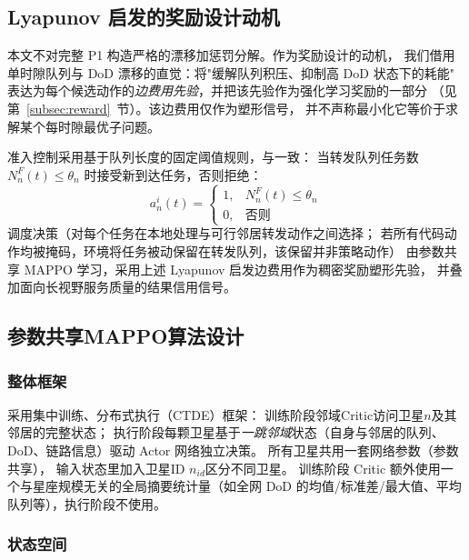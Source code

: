 \documentclass[a4paper,11pt]{article}
\begin{document}
\subsection{Lyapunov 启发的奖励设计动机}

本文不对完整 P1 构造严格的漂移加惩罚分解。作为奖励设计的动机，
我们借用单时隙队列与 DoD 漂移的直觉：将"缓解队列积压、抑制高 DoD 状态下的耗能"
表达为每个候选动作的\emph{边费用先验}，并把该先验作为强化学习奖励的一部分
（见第~\ref{subsec:reward}~节）。该边费用仅作为塑形信号，
并不声称最小化它等价于求解某个每时隙最优子问题。

准入控制采用基于队列长度的固定阈值规则，与\cite{zhang2024mhspo}一致：
当转发队列任务数 $N^F_n(t) \le \theta_n$ 时接受新到达任务，否则拒绝：
\begin{equation}
a^i_n(t) = \begin{cases} 1, & N^F_n(t) \leq \theta_n \\ 0, & \text{否则} \end{cases}
\label{eq:admission}
\end{equation}
调度决策（对每个任务在本地处理与可行邻居转发动作之间选择；
若所有代码动作均被掩码，环境将任务被动保留在转发队列，该保留并非策略动作）
由参数共享 MAPPO 学习，采用上述 Lyapunov 启发边费用作为稠密奖励塑形先验，
并叠加面向长视野服务质量的结果信用信号。

\subsection{参数共享MAPPO算法设计}

\subsubsection{整体框架}

采用集中训练、分布式执行（CTDE）框架：
训练阶段邻域Critic访问卫星$n$及其邻居的完整状态；
执行阶段每颗卫星基于\emph{一跳邻域}状态（自身与邻居的队列、DoD、链路信息）驱动 Actor 网络独立决策。
所有卫星共用一套网络参数（参数共享），
输入状态里加入卫星ID $n_{id}$区分不同卫星。
训练阶段 Critic 额外使用一个与星座规模无关的全局摘要统计量（如全网 DoD 的均值/标准差/最大值、平均队列等），执行阶段不使用。

\subsubsection{状态空间}
\end{document}
